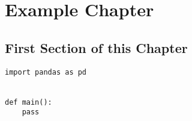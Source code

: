 
\chapter{Example Chapter}

\section{First Section of this Chapter}

\begin{lstlisting}[caption={My Caption},captionpos=b]
import pandas as pd


def main():
    pass
\end{lstlisting}
